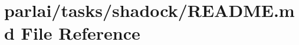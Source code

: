\hypertarget{parlai_2tasks_2shadock_2README_8md}{}\section{parlai/tasks/shadock/\+R\+E\+A\+D\+ME.md File Reference}
\label{parlai_2tasks_2shadock_2README_8md}
